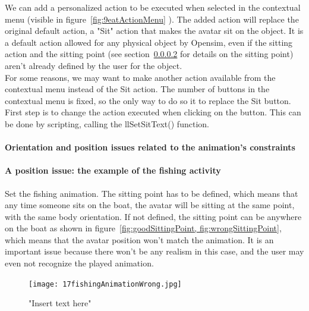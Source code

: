 {\begin{itemize}
\begin{itemize}
We can add a personalized action to be executed when selected in the contextual menu (visible in figure~\ref{fig:9eatActionMenu}%
). The added action will replace the original default action, a "Sit" action that makes the avatar sit on the object. It is a default action allowed for any physical object by Opensim, even if the sitting action and the sitting point (see section~\ref{sittingpoint} for details on the sitting point) aren't already defined by the user for the object. 
\\For some reasons, we may want to make another action available from the contextual menu instead of the Sit action. The number of buttons in the contextual menu is fixed, so the only way to do so it to replace the Sit button. First step is to change the action executed when clicking on the button. This can be done by scripting, calling the llSetSitText() function. 

	\paragraph{Orientation and position issues related to the animation's constraints}

\paragraph{A position issue: the example of the fishing activity}
\label{sittingpoint}


Set the fishing animation.
The sitting point has to be defined, which means that any time someone sits on the boat, the avatar will be sitting at the same point, with the same body orientation. If not defined, the sitting point can be anywhere on the boat as shown in figure~\ref{fig:goodSittingPoint, fig:wrongSittingPoint}, which means that the avatar position won't match the animation. It is an important issue because there won't be any realism in this case, and the user may even not recognize the played animation.

\begin{figure}[h]
  \caption{"Insert text here"}
  \centering
  \texttt{[image: 17fishingAnimationWrong.jpg]}
  \label{fig:17fishingAnimationWrong}
\end{figure}


\end{itemize}
\end{itemize}}
